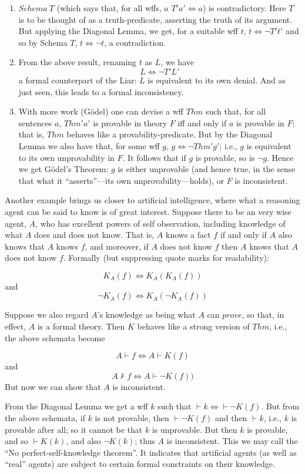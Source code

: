 \documentclass{amsart}
\begin{document}
\begin{enumerate}
\item
$Schema~ T$ (which says that, for all wffs, $a$ $T'a' \iff a$)
is contradictory.  Here $T$ is to be thought of as a truth-predicate,
asserting the truth of its argument.  But applying the Diagonal
Lemma, we get, for a suitable wff $t$, $t \iff \neg T't'$ and so by
Schema $T$, $t \iff \neg t$, a contradiction. 
\item
From the above result, renaming $t$ as $L$, we have
$$L \iff \neg T'L'$$
a formal counterpart of the Liar: $L$ is equivalent to its own
denial. And as just seen, this leads to a formal inconsistency.
\item
With more work (G\"{o}del) one can devise a wff $Thm$ such that, for all
sentences $a$, $Thm 'a'$ is provable in theory $F$ iff and only if $a$
is provable in $F$; that is, $Thm$ behaves like a provability-predicate.  But by
the Diagonal Lemma we also have that, for some wff $g$, $g \iff \neg
Thm 'g'$; i.e., $g$ is equivalent to its own unprovability in $F$. It follows that
if $g$ is provable, so is $\neg g$. Hence we 
get G\"{o}del's Theorem: $g$ is either unprovable (and hence true, in
the sense that what it ``asserts''---its own unprovability---holds),
or $F$ is inconsistent.
\end{enumerate}

Another example brings us closer to artificial intelligence, where
what a reasoning agent can be said to know is of great interest.
Suppose there to be an very wise agent, $A$, who has excellent powers of
self observation, including knowledge of what $A$ does and does not
know.  That is,  $A$ knows a fact $f$ if and only if $A$ also knows
that $A$ knows $f$, and moreover, if $A$ does not know $f$ then $A$
knows that $A$ does not know $f$. Formally (but suppressing quote
marks for readability):

$$K_A(f) \iff K_A(K_A(f))$$
and
$$\neg K_A(f) \iff K_A(\neg K_A(f))$$

Suppose we also regard $A$'s knowledge as being what $A$ can $prove$,
so that, in effect, $A$ is a formal theory.  Then $K$ behaves like
a strong version of $Thm$, i.e., the above schemata become

$$A \vdash f \iff A \vdash K(f)$$
and
$$A \not \vdash f \iff A \vdash \neg K(f))$$
\smallskip
\noindent
But now we can show that $A$ is inconsistent.  

From the Diagonal Lemma we get a wff $k$
such that $\vdash k \iff \vdash \neg K(f)$. But from the above schemata,
if $k$ is not provable, then $\vdash
\neg K(f)$ and then $\vdash k$, i.e., $k$ is provable after all;
so it cannot be that $k$ is unprovable.  But then $k$ is
provable, and so $\vdash K(k)$, and also $\neg K(k)$; thus $A$ is
inconsistent.  This we may call the ``No perfect-self-knowledge
theorem''.  It indicates that artificial agents (as well as ``real''
agents) are subject to certain formal constraints on their knowledge.
\end{document}
